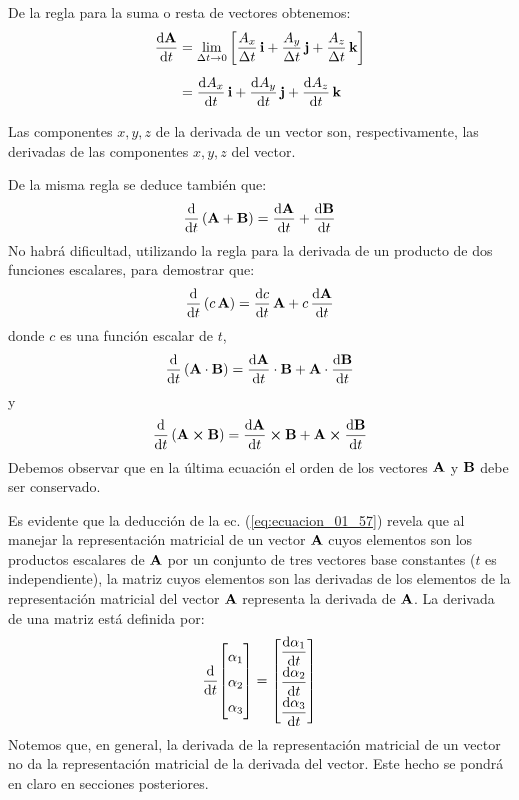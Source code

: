 De la regla para la suma o resta de vectores obtenemos:
\begin{align}
\begin{aligned}
    \dv{\vb{A}}{t} &= \lim_{\Delta t \to 0} \left[ \dfrac{A_{x}}{\Delta t} \, \vb{i} + \dfrac{A_{y}}{\Delta t} \, \vb{j} + \dfrac{A_{z}}{\Delta t} \, \vb{k} \right] \\[0.5em]
&= \dv{A_{x}}{t} \, \vb{i} + \dv{A_{y}}{t} \, \vb{j} + \dv{A_{z}}{t} \, \vb{k} \\[0.5em]
\end{aligned}
\label{eq:ecuacion_01_57}
\end{align}
Las componentes $x, y, z$ de la derivada de un vector son, respectivamente, las derivadas de las componentes $x, y, z$ del vector.
\par
De la misma regla se deduce también que:
\begin{align}
    \dv{t} \left( \vb{A} + \vb{B} \right) = \dv{\vb{A}}{t} + \dv{\vb{B}}{t}
    \label{eq:ecuacion_01_58}
\end{align}
No habrá dificultad, utilizando la regla para la derivada de un producto de dos funciones escalares, para demostrar que:
\begin{align}
    \dv{t} \left( c\, \vb{A} \right) = \dv{c}{t} \, \vb{A} + c \, \dv{\vb{A}}{t}
    \label{eq:ecuacion_01_59}
\end{align}
donde $c$ es una función escalar de $t$,
\begin{align}
    \dv{t} \left( \vb{A} \cdot \vb{B} \right) = \dv{\vb{A}}{t} \cdot \vb{B} + \vb{A} \cdot \dv{\vb{B}}{t}
    \label{eq:ecuacion_01_60}
\end{align}
y
\begin{align}
    \dv{t} \left( \vb{A} \cp \vb{B} \right) = \dv{\vb{A}}{t} \cp \vb{B} + \vb{A} \cp \dv{\vb{B}}{t}
    \label{eq:ecuacion_01_61}
\end{align}
Debemos observar que en la última ecuación el orden de los vectores $\vb{A}$ y $\vb{B}$ debe ser conservado.
\par
Es evidente que la deducción de la ec. (\ref{eq:ecuacion_01_57}) revela que al manejar la representación matricial de un vector $\vb{A}$ cuyos elementos son los productos escalares de $\vb{A}$ por un conjunto de tres vectores base constantes ($t$ es independiente), la matriz cuyos elementos son las derivadas de los elementos de la representación matricial del vector $\vb{A}$ representa la derivada de $\vb{A}$. La derivada de una matriz está definida por:
\begin{align}
    \renewcommand{\arraystretch}{1.5}
    \dv{t} \mqty[ \alpha_{1} \\ \alpha_{2} \\ \alpha_{3} ] = \mqty[ \displaystyle \dv{\alpha_{1}}{t} \\[0.25em] \displaystyle \dv{\alpha_{2}}{t} \\[0.25em] \displaystyle \dv{\alpha_{3}}{t} ]
    \label{eq:ecuacion_01_62}
\end{align}
Notemos que, en general, la derivada de la representación matricial de un vector no da la representación matricial de la derivada del vector. Este hecho se pondrá en claro en secciones posteriores.

